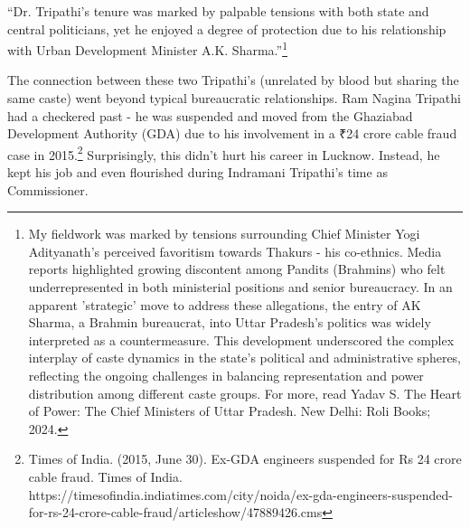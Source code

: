 ``Dr. Tripathi's tenure was marked by palpable tensions with both state and central politicians, yet he enjoyed a degree of protection due to his relationship with Urban Development Minister A.K. Sharma.''\footnote{My fieldwork was marked by tensions surrounding Chief Minister Yogi Adityanath's perceived favoritism towards Thakurs - his co-ethnics. Media reports highlighted growing discontent among Pandits (Brahmins) who felt underrepresented in both ministerial positions and senior bureaucracy. In an apparent 'strategic' move to address these allegations, the entry of AK Sharma, a Brahmin bureaucrat, into Uttar Pradesh's politics was widely interpreted as a countermeasure. This development underscored the complex interplay of caste dynamics in the state's political and administrative spheres, reflecting the ongoing challenges in balancing representation and power distribution among different caste groups. For more, read Yadav S. The Heart of Power: The Chief Ministers of Uttar Pradesh. New Delhi: Roli Books; 2024.}

The connection between these two Tripathi's (unrelated by blood but sharing the same caste) went beyond typical bureaucratic relationships. Ram Nagina Tripathi had a checkered past - he was suspended and moved from the Ghaziabad Development Authority (GDA) due to his involvement in a ₹24 crore cable fraud case in 2015.\footnote{Times of India. (2015, June 30). Ex-GDA engineers suspended for Rs 24 crore cable fraud. Times of India. https://timesofindia.indiatimes.com/city/noida/ex-gda-engineers-suspended-for-rs-24-crore-cable-fraud/articleshow/47889426.cms} Surprisingly, this didn't hurt his career in Lucknow. Instead, he kept his job and even flourished during Indramani Tripathi's time as Commissioner.

